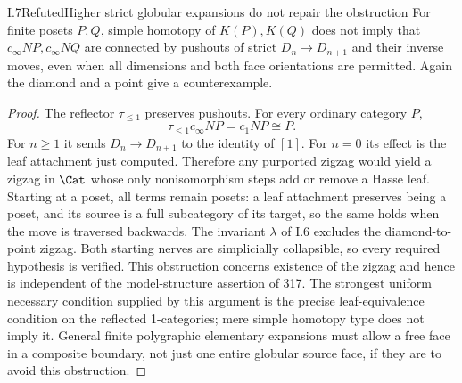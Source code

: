 \begin{claim}{I.7}{Refuted}{Higher strict globular expansions do not repair the obstruction}
For finite posets $P,Q$, simple homotopy of $K(P),K(Q)$ does not imply
that $c_\infty NP,c_\infty NQ$ are connected by pushouts of strict
$D_n\to D_{n+1}$ and their inverse moves, even when all dimensions
and both face orientations are permitted. Again the diamond and a
point give a counterexample.
\end{claim}
\begin{proof}
The reflector $\tau_{\leq1}$ preserves pushouts. For every ordinary
category $P$,
\[
 \tau_{\leq1}c_\infty NP=c_1NP\cong P.
\]
For $n\geq1$ it sends $D_n\to D_{n+1}$ to the identity of $[1]$.
For $n=0$ its effect is the leaf attachment just computed. Therefore
any purported zigzag would yield a zigzag in $\Cat$ whose only
nonisomorphism steps add or remove a Hasse leaf. Starting at a poset,
all terms remain posets: a leaf attachment preserves being a poset,
and its source is a full subcategory of its target, so the same holds
when the move is traversed backwards. The invariant $\lambda$ of
I.6 excludes the diamond-to-point zigzag. Both starting nerves are
simplicially collapsible, so every required hypothesis is verified.
This obstruction concerns existence of the zigzag and hence is
independent of the model-structure assertion of 317. The strongest
uniform necessary condition supplied by this argument is the precise
leaf-equivalence condition on the reflected 1-categories; mere simple
homotopy type does not imply it. General finite polygraphic elementary
expansions must allow a free face in a composite boundary, not just
one entire globular source face, if they are to avoid this obstruction.
\end{proof}

